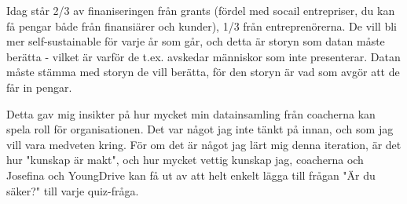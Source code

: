 Idag står 2/3 av finaniseringen från grants (fördel med socail entrepriser, du kan få pengar både från finansiärer och kunder), 1/3 från entreprenörerna. De vill bli mer self-sustainable för varje år som går, och detta är storyn som datan måste berätta - vilket är varför de t.ex. avskedar människor som inte presenterar. Datan måste stämma med storyn de vill berätta, för den storyn är vad som avgör att de får in pengar.

Detta gav mig insikter på hur mycket min datainsamling från coacherna kan spela roll för organisationen. Det var något jag inte tänkt på innan, och som jag vill vara medveten kring. För om det är något jag lärt mig denna iteration, är det hur "kunskap är makt", och hur mycket vettig kunskap jag, coacherna och Josefina och YoungDrive kan få ut av att helt enkelt lägga till frågan "Är du säker?" till varje quiz-fråga.
